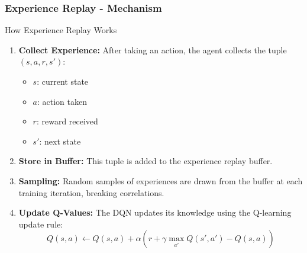 \documentclass[aspectratio=169]{beamer}
\begin{document}
\begin{frame}[fragile]
  \frametitle{Experience Replay - Mechanism}
  \begin{block}{How Experience Replay Works}
    \begin{enumerate}
      \item \textbf{Collect Experience:} After taking an action, the agent collects the tuple \( (s, a, r, s') \):
        \begin{itemize}
          \item \( s \): current state
          \item \( a \): action taken
          \item \( r \): reward received
          \item \( s' \): next state
        \end{itemize}
      \item \textbf{Store in Buffer:} This tuple is added to the experience replay buffer.
      \item \textbf{Sampling:} Random samples of experiences are drawn from the buffer at each training iteration, breaking correlations.
      \item \textbf{Update Q-Values:} The DQN updates its knowledge using the Q-learning update rule:
        \begin{equation}
          Q(s, a) \leftarrow Q(s, a) + \alpha \left( r + \gamma \max_{a'} Q(s', a') - Q(s, a) \right)
        \end{equation}
      \end{enumerate}
  \end{block}
\end{frame}
\end{document}
